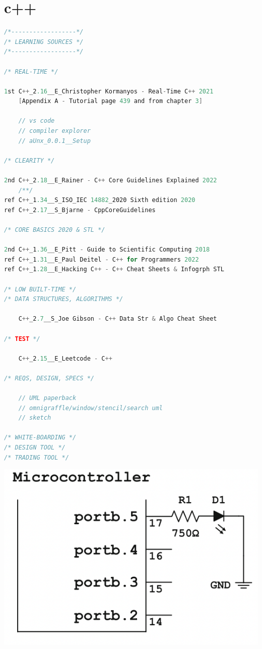\documentclass[8pt]{extarticle}
\begin{document}
\begin{small}
\begin{multicols}{2}
\begin{lstlisting}[language=C]
\end{lstlisting}

\vfill\null
\columnbreak

\section{c++}

\begin{lstlisting}[language=C]
/*------------------*/
/* LEARNING SOURCES */
/*------------------*/

/* REAL-TIME */

1st	C++_2.16__E_Christopher Kormanyos - Real-Time C++ 2021
	[Appendix A - Tutorial page 439 and from chapter 3]

	// vs code
	// compiler explorer
	// aUnx_0.0.1__Setup
	
/* CLEARITY */
	
2nd	C++_2.18__E_Rainer - C++ Core Guidelines Explained 2022
	/**/
ref	C++_1.34__S_ISO_IEC 14882_2020 Sixth edition 2020
ref	C++_2.17__S_Bjarne - CppCoreGuidelines
	
/* CORE BASICS 2020 & STL */

2nd	C++_1.36__E_Pitt - Guide to Scientific Computing 2018
ref	C++_1.31__E_Paul Deitel - C++ for Programmers 2022
ref C++_1.28__E_Hacking C++ - C++ Cheat Sheets & Infogrph STL

/* LOW BUILT-TIME */
/* DATA STRUCTURES, ALGORITHMS */

	C++_2.7__S_Joe Gibson - C++ Data Str & Algo Cheat Sheet

/* TEST */

	C++_2.15__E_Leetcode - C++

/* REQS, DESIGN, SPECS */

	// UML paperback
	// omnigraffle/window/stencil/search uml
	// sketch

/* WHITE-BOARDING */
/* DESIGN TOOL */
/* TRADING TOOL */
\end{lstlisting}


\includegraphics[scale=0.3]{mcontroller}


\end{multicols}
\end{small}
\end{document}
